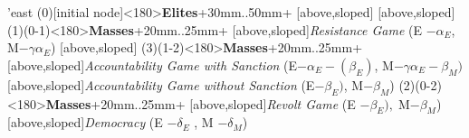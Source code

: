 	\begin{istgame}[font=\footnotesize]
	\centering
	\setistgrowdirection'{east}
	\xtShowArrows
	\istroot(0)[initial node]<180>{\textbf{Elites}}+30mm..50mm+
	[above,sloped]  [above,sloped] \endist
	\istroot(1)(0-1)<180>{\textbf{Masses}}+20mm..25mm+
	[above,sloped]{\textit{Resistance Game} (E $- \alpha_{E}$, M$-\gamma\alpha_{E}$) }
	[above,sloped]{ }  \endist
	\istroot(3)(1-2)<180>{\textbf{Masses}}+20mm..25mm+
	[above,sloped]{\textit{Accountability Game with Sanction}
		(E$- \alpha_{E}- (\beta_{E})$, M$-\gamma\alpha_{E}-\beta_{M})$}
	[above,sloped]{\textit{Accountability Game without Sanction} 
		(E$- \beta_{E})$, M$-\beta_{M}$)} \endist
	\istroot(2)(0-2)<180>{\textbf{Masses}}+20mm..25mm+
	[above,sloped]{\textit{Revolt Game} (E $- \beta_{E}),\; $M$-\beta_{M}$)}
	[above,sloped]{\textit{Democracy} (E $-\delta_{E}$ , M $- \delta_{M}$)} \endist
\end{istgame}